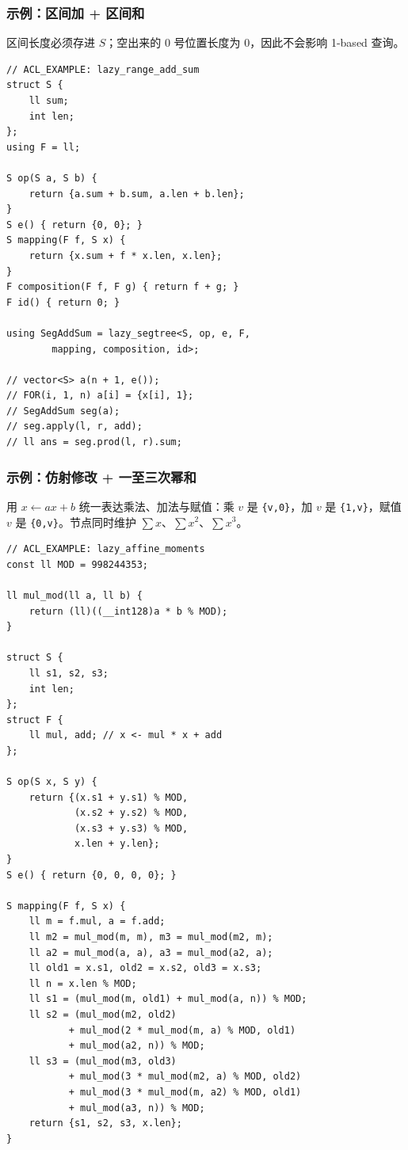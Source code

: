 		\begin{multicols*}{2}

			\subsubsection{示例：区间加 + 区间和}

			区间长度必须存进 $S$；空出来的 0 号位置长度为 $0$，因此不会影响 1-based 查询。

			\begin{verbatim}
// ACL_EXAMPLE: lazy_range_add_sum
struct S {
    ll sum;
    int len;
};
using F = ll;

S op(S a, S b) {
    return {a.sum + b.sum, a.len + b.len};
}
S e() { return {0, 0}; }
S mapping(F f, S x) {
    return {x.sum + f * x.len, x.len};
}
F composition(F f, F g) { return f + g; }
F id() { return 0; }

using SegAddSum = lazy_segtree<S, op, e, F,
        mapping, composition, id>;

// vector<S> a(n + 1, e());
// FOR(i, 1, n) a[i] = {x[i], 1};
// SegAddSum seg(a);
// seg.apply(l, r, add);
// ll ans = seg.prod(l, r).sum;
			\end{verbatim}

			\subsubsection{示例：仿射修改 + 一至三次幂和}

			用 $x\leftarrow ax+b$ 统一表达乘法、加法与赋值：乘 $v$ 是 \texttt{\{v,0\}}，加 $v$ 是 \texttt{\{1,v\}}，赋值 $v$ 是 \texttt{\{0,v\}}。节点同时维护 $\sum x$、$\sum x^2$、$\sum x^3$。

			\begin{verbatim}
// ACL_EXAMPLE: lazy_affine_moments
const ll MOD = 998244353;

ll mul_mod(ll a, ll b) {
    return (ll)((__int128)a * b % MOD);
}

struct S {
    ll s1, s2, s3;
    int len;
};
struct F {
    ll mul, add; // x <- mul * x + add
};

S op(S x, S y) {
    return {(x.s1 + y.s1) % MOD,
            (x.s2 + y.s2) % MOD,
            (x.s3 + y.s3) % MOD,
            x.len + y.len};
}
S e() { return {0, 0, 0, 0}; }

S mapping(F f, S x) {
    ll m = f.mul, a = f.add;
    ll m2 = mul_mod(m, m), m3 = mul_mod(m2, m);
    ll a2 = mul_mod(a, a), a3 = mul_mod(a2, a);
    ll old1 = x.s1, old2 = x.s2, old3 = x.s3;
    ll n = x.len % MOD;
    ll s1 = (mul_mod(m, old1) + mul_mod(a, n)) % MOD;
    ll s2 = (mul_mod(m2, old2)
           + mul_mod(2 * mul_mod(m, a) % MOD, old1)
           + mul_mod(a2, n)) % MOD;
    ll s3 = (mul_mod(m3, old3)
           + mul_mod(3 * mul_mod(m2, a) % MOD, old2)
           + mul_mod(3 * mul_mod(m, a2) % MOD, old1)
           + mul_mod(a3, n)) % MOD;
    return {s1, s2, s3, x.len};
}


\end{verbatim}
\end{multicols*}
